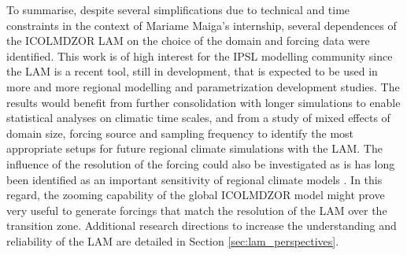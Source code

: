 \hfill

To summarise, despite several simplifications due to technical and time constraints in the context of Mariame Maiga's internship, several dependences of the ICOLMDZOR LAM on the choice of the domain and forcing data were identified. This work is of high interest for the IPSL modelling community since the LAM is a recent tool, still in development, that is expected to be used in more and more regional modelling and parametrization development studies.
The results would benefit from further consolidation with longer simulations to enable statistical analyses on climatic time scales, and from a study of mixed effects of domain size, forcing source and sampling frequency to identify the most appropriate setups for future regional climate simulations with the LAM.
The influence of the resolution of the forcing could also be investigated as is has long been identified as an important sensitivity of regional climate models \citep{leduc_regional_2009}. In this regard, the zooming capability of the global ICOLMDZOR model might prove very useful to generate forcings that match the resolution of the LAM over the transition zone. Additional research directions to increase the understanding and reliability of the LAM are detailed in Section \ref{sec:lam_perspectives}.